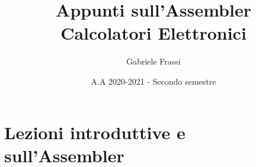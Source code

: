 \documentclass[11pt]{report}
\theoremstyle{definition}
\begin{document}
	\title{\textbf{Appunti sull'Assembler}\\Calcolatori Elettronici}
	\author{Gabriele Frassi}
	\date{A.A 2020-2021 - Secondo semestre\doclicenseThis}
	\maketitle
	
	\small\tableofcontents\normalsize

	
	

	\part{Lezioni introduttive e sull'Assembler}
	
	
	
	
	
	
	
	
	
	
	
\end{document}
